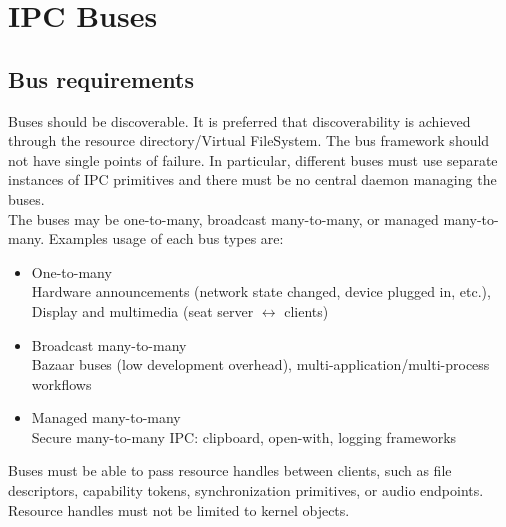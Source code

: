 \section{IPC Buses}
\subsection{Bus requirements}
Buses should be discoverable. It is preferred that discoverability is achieved through the resource directory/Virtual FileSystem. The bus framework should not have single points of failure. In particular, different buses must use separate instances of IPC primitives and there must be no central daemon managing the buses.\\
The buses may be one-to-many, broadcast many-to-many, or managed many-to-many. Examples usage of each bus types are:
\begin{itemize}
	\item One-to-many\\
	Hardware announcements (network state changed, device plugged in, etc.), Display and multimedia (seat server $\leftrightarrow$ clients)
	\item Broadcast many-to-many\\
	Bazaar buses (low development overhead), multi-application/multi-process workflows
	\item Managed many-to-many\\
	Secure many-to-many IPC: clipboard, open-with, logging frameworks
\end{itemize}
Buses must be able to pass resource handles between clients, such as file descriptors, capability tokens, synchronization primitives, or audio endpoints. Resource handles must not be limited to kernel objects.
